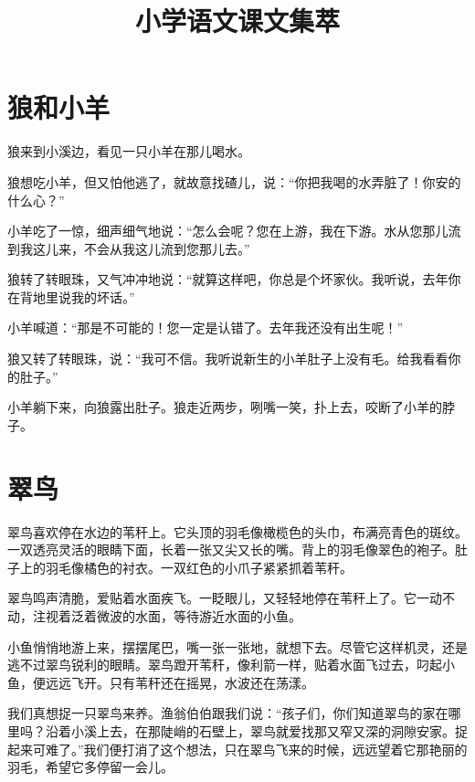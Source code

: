 \documentclass[12pt,UTF-8,openany]{ctexbook}
\title{\zihao{0} \bfseries 小学语文课文集萃}
\author{}
\date{}
\begin{document}
\maketitle
\tableofcontents
\newpage

\chapter{狼和小羊}

\begin{large}
    
    狼来到小溪边，看见一只小羊在那儿喝水。
    
    狼想吃小羊，但又怕他逃了，就故意找碴儿，说：“你把我喝的水弄脏了！你安的什么心？”
    
    小羊吃了一惊，细声细气地说：“怎么会呢？您在上游，我在下游。水从您那儿流到我这儿来，不会从我这儿流到您那儿去。”
    
    狼转了转眼珠，又气冲冲地说：“就算这样吧，你总是个坏家伙。我听说，去年你在背地里说我的坏话。”
    
    小羊喊道：“那是不可能的！您一定是认错了。去年我还没有出生呢！”
    
    狼又转了转眼珠，说：“我可不信。我听说新生的小羊肚子上没有毛。给我看看你的肚子。”
    
    小羊躺下来，向狼露出肚子。狼走近两步，咧嘴一笑，扑上去，咬断了小羊的脖子。
    
\end{large}



\chapter{翠鸟}

\begin{large}
    
    翠鸟喜欢停在水边的苇秆上。它头顶的羽毛像橄榄色的头巾，布满亮青色的斑纹。一双透亮灵活的眼睛下面，长着一张又尖又长的嘴。背上的羽毛像翠色的袍子。肚子上的羽毛像橘色的衬衣。一双红色的小爪子紧紧抓着苇秆。
    
    翠鸟鸣声清脆，爱贴着水面疾飞。一眨眼儿，又轻轻地停在苇秆上了。它一动不动，注视着泛着微波的水面，等待游近水面的小鱼。
    
    小鱼悄悄地游上来，摆摆尾巴，嘴一张一张地，就想下去。尽管它这样机灵，还是逃不过翠鸟锐利的眼睛。翠鸟蹬开苇秆，像利箭一样，贴着水面飞过去，叼起小鱼，便远远飞开。只有苇秆还在摇晃，水波还在荡漾。
    
    我们真想捉一只翠鸟来养。渔翁伯伯跟我们说：“孩子们，你们知道翠鸟的家在哪里吗？沿着小溪上去，在那陡峭的石壁上，翠鸟就爱找那又窄又深的洞隙安家。捉起来可难了。”我们便打消了这个想法，只在翠鸟飞来的时候，远远望着它那艳丽的羽毛，希望它多停留一会儿。
    
\end{large}
\end{document}
